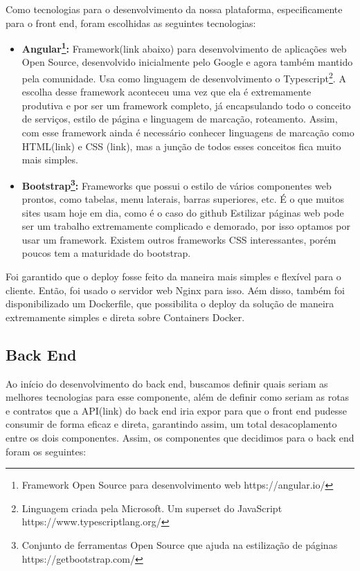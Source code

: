 \documentclass[11pt,twoside]{article}
\begin{document}
Como tecnologias para o desenvolvimento da nossa plataforma, especificamente para o front end, foram escolhidas as seguintes tecnologias:

\begin{itemize}
  \item \textbf{Angular\footnote{Framework Open Source para desenvolvimento web https://angular.io/}:} Framework(link abaixo) para desenvolvimento de aplicações web Open Source, desenvolvido inicialmente pelo Google e agora também mantido pela comunidade. Usa como linguagem de desenvolvimento o
  Typescript\footnote{Linguagem criada pela Microsoft. Um superset do JavaScript https://www.typescriptlang.org/}. A escolha desse framework aconteceu uma vez que ela é extremamente produtiva e por ser um framework completo, já encapsulando todo o conceito de serviços, estilo de página e 
  linguagem de marcação, roteamento. Assim, com esse framework ainda é necessário conhecer linguagens de marcação como HTML(link) e CSS (link), mas a junção de todos esses conceitos fica muito mais simples.
  \item \textbf{Bootstrap\footnote{Conjunto de ferramentas Open Source que ajuda na estilização de páginas https://getbootstrap.com/}:} Frameworks que possui o estilo de vários componentes web prontos, como tabelas, menu laterais, barras superiores, etc. É o que muitos sites usam hoje em dia, como é o caso do github
  Estilizar páginas web pode ser um trabalho extremamente complicado e demorado, por isso optamos por usar um framework. Existem outros frameworks CSS interessantes, porém poucos tem a maturidade do bootstrap.
\end{itemize}

Foi garantido que o deploy fosse feito da maneira mais simples e flexível para o cliente. Então, foi usado o servidor web Nginx para isso. Aém disso, também foi disponibilizado um Dockerfile, que possibilita
o deploy da solução de maneira extremamente simples e direta sobre Containers Docker.

\subsection{Back End}

Ao início do desenvolvimento do back end, buscamos definir quais seriam as melhores tecnologias para esse componente, além de definir como seriam as rotas e contratos que a API(link) do back end iria expor
para que o front end pudesse consumir de forma eficaz e direta, garantindo assim, um total desacoplamento entre os dois componentes. Assim, os componentes que decidimos para o back end foram os seguintes:
\end{document}
